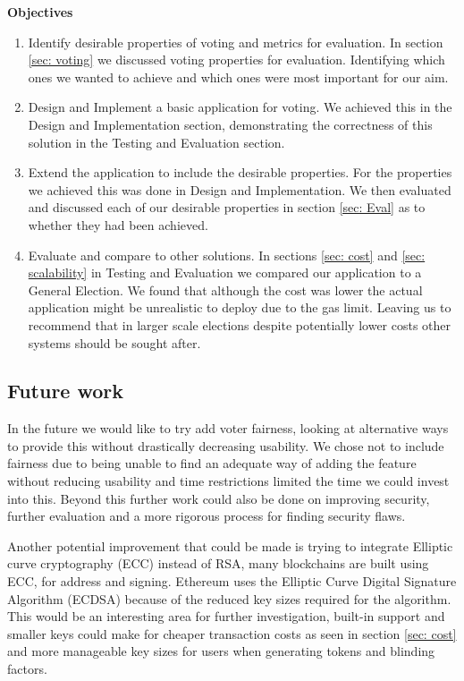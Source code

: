 \documentclass{entcs}
\begin{document}
{\bf Objectives}
\begin{enumerate}
    \item Identify desirable properties of voting and metrics for evaluation. In section \ref{sec: voting} we discussed voting properties for evaluation. Identifying which ones we wanted to achieve and which ones were most important for our aim.
    \item Design and Implement a basic application for voting. We achieved this in the Design and Implementation section, demonstrating the correctness of this solution in the Testing and Evaluation section.
    \item Extend the application to include the desirable properties. For the properties we achieved this was done in Design and Implementation. We then evaluated and discussed each of our desirable properties in section \ref{sec: Eval} as to whether they had been achieved.
    \item Evaluate and compare to other solutions. In sections \ref{sec: cost} and \ref{sec: scalability} in Testing and Evaluation we compared our application to a General Election. We found that although the cost was lower the actual application might be unrealistic to deploy due to the gas limit. Leaving us to recommend that in larger scale elections despite potentially lower costs other systems should be sought after.
\end{enumerate}

\subsection{Future work}
In the future we would like to try add voter fairness, looking at alternative ways to provide this without drastically decreasing usability. We chose not to include fairness due to being unable to find an adequate way of adding the feature without reducing usability and time restrictions limited the time we could invest into this. Beyond this further work could also be done on improving security, further evaluation and a more rigorous process for finding security flaws.

Another potential improvement that could be made is trying to integrate Elliptic curve cryptography (ECC) instead of RSA, many blockchains are built using ECC, for address and signing. Ethereum uses the Elliptic Curve Digital Signature Algorithm (ECDSA) because of the reduced key sizes required for the algorithm. This would be an interesting area for further investigation, built-in support and smaller keys could make for cheaper transaction costs as seen in section \ref{sec: cost} and more manageable key sizes for users when generating tokens and blinding factors.
\end{document}
